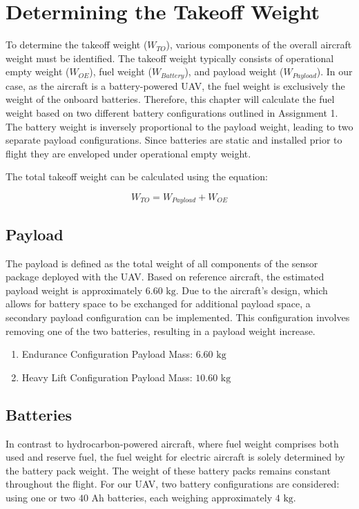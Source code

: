 \documentclass[12pt]{article}
\begin{document}
	\section{Determining the Takeoff Weight}
	To determine the takeoff weight (\(W_{TO}\)), various components of the overall aircraft weight must be identified. The takeoff weight typically consists of operational empty weight (\(W_{OE}\)), fuel weight (\(W_{Battery}\)), and payload weight (\(W_{Payload}\)). In our case, as the aircraft is a battery-powered UAV, the fuel weight is exclusively the weight of the onboard batteries. Therefore, this chapter will calculate the fuel weight based on two different battery configurations outlined in Assignment 1. The battery weight is inversely proportional to the payload weight, leading to two separate payload configurations. Since batteries are static and installed prior to flight they are enveloped under operational empty weight.
	
	The total takeoff weight can be calculated using the equation:
	
	\begin{equation}
		W_{TO} = W_{Payload} + W_{OE} \tag{Eq 2.1}
	\end{equation}
	
	\subsection{Payload}
	The payload is defined as the total weight of all components of the sensor package deployed with the UAV. Based on reference aircraft, the estimated payload weight is approximately \(6.60 \text{ kg}\). Due to the aircraft's design, which allows for battery space to be exchanged for additional payload space, a secondary payload configuration can be implemented. This configuration involves removing one of the two batteries, resulting in a payload weight increase.
	\begin{enumerate}
		\item Endurance Configuration Payload Mass: \(6.60 \text{ kg}\) 
		\item Heavy Lift Configuration Payload Mass: \(10.60 \text{ kg}\)
	\end{enumerate}

	
	
	\subsection{Batteries}
	In contrast to hydrocarbon-powered aircraft, where fuel weight comprises both used and reserve fuel, the fuel weight for electric aircraft is solely determined by the battery pack weight. The weight of these battery packs remains constant throughout the flight. For our UAV, two battery configurations are considered: using one or two \(40 \text{ Ah}\) batteries, each weighing approximately \(4 \text{ kg}\).
\end{document}
